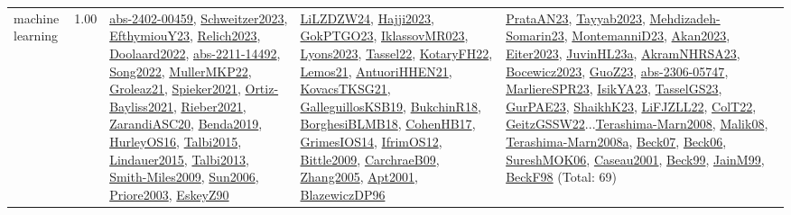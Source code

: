 {\begin{longtable}{p{3cm}r>{\raggedright\arraybackslash}p{6cm}>{\raggedright\arraybackslash}p{6cm}>{\raggedright\arraybackslash}p{8cm}}
\index{machine learning}\index{Algorithms!machine learning}machine learning &  1.00 & \hyperref[detail:abs-2402-00459]{abs-2402-00459}, \hyperref[detail:Schweitzer2023]{Schweitzer2023}, \hyperref[detail:EfthymiouY23]{EfthymiouY23}, \hyperref[detail:Relich2023]{Relich2023}, \hyperref[detail:Doolaard2022]{Doolaard2022}, \hyperref[detail:abs-2211-14492]{abs-2211-14492}, \hyperref[detail:Song2022]{Song2022}, \hyperref[detail:MullerMKP22]{MullerMKP22}, \hyperref[detail:Groleaz21]{Groleaz21}, \hyperref[detail:Spieker2021]{Spieker2021}, \hyperref[detail:Ortiz-Bayliss2021]{Ortiz-Bayliss2021}, \hyperref[detail:Rieber2021]{Rieber2021}, \hyperref[detail:ZarandiASC20]{ZarandiASC20}, \hyperref[detail:Benda2019]{Benda2019}, \hyperref[detail:HurleyOS16]{HurleyOS16}, \hyperref[detail:Talbi2015]{Talbi2015}, \hyperref[detail:Lindauer2015]{Lindauer2015}, \hyperref[detail:Talbi2013]{Talbi2013}, \hyperref[detail:Smith-Miles2009]{Smith-Miles2009}, \hyperref[detail:Sun2006]{Sun2006}, \hyperref[detail:Priore2003]{Priore2003}, \hyperref[detail:EskeyZ90]{EskeyZ90} & \hyperref[detail:LiLZDZW24]{LiLZDZW24}, \hyperref[detail:Hajji2023]{Hajji2023}, \hyperref[detail:GokPTGO23]{GokPTGO23}, \hyperref[detail:IklassovMR023]{IklassovMR023}, \hyperref[detail:Lyons2023]{Lyons2023}, \hyperref[detail:Tassel22]{Tassel22}, \hyperref[detail:KotaryFH22]{KotaryFH22}, \hyperref[detail:Lemos21]{Lemos21}, \hyperref[detail:AntuoriHHEN21]{AntuoriHHEN21}, \hyperref[detail:KovacsTKSG21]{KovacsTKSG21}, \hyperref[detail:GalleguillosKSB19]{GalleguillosKSB19}, \hyperref[detail:BukchinR18]{BukchinR18}, \hyperref[detail:BorghesiBLMB18]{BorghesiBLMB18}, \hyperref[detail:CohenHB17]{CohenHB17}, \hyperref[detail:GrimesIOS14]{GrimesIOS14}, \hyperref[detail:IfrimOS12]{IfrimOS12}, \hyperref[detail:Bittle2009]{Bittle2009}, \hyperref[detail:CarchraeB09]{CarchraeB09}, \hyperref[detail:Zhang2005]{Zhang2005}, \hyperref[detail:Apt2001]{Apt2001}, \hyperref[detail:BlazewiczDP96]{BlazewiczDP96} & \hyperref[detail:PrataAN23]{PrataAN23}, \hyperref[detail:Tayyab2023]{Tayyab2023}, \hyperref[detail:Mehdizadeh-Somarin23]{Mehdizadeh-Somarin23}, \hyperref[detail:MontemanniD23]{MontemanniD23}, \hyperref[detail:Akan2023]{Akan2023}, \hyperref[detail:Eiter2023]{Eiter2023}, \hyperref[detail:JuvinHL23a]{JuvinHL23a}, \hyperref[detail:AkramNHRSA23]{AkramNHRSA23}, \hyperref[detail:Bocewicz2023]{Bocewicz2023}, \hyperref[detail:GuoZ23]{GuoZ23}, \hyperref[detail:abs-2306-05747]{abs-2306-05747}, \hyperref[detail:MarliereSPR23]{MarliereSPR23}, \hyperref[detail:IsikYA23]{IsikYA23}, \hyperref[detail:TasselGS23]{TasselGS23}, \hyperref[detail:GurPAE23]{GurPAE23}, \hyperref[detail:ShaikhK23]{ShaikhK23}, \hyperref[detail:LiFJZLL22]{LiFJZLL22}, \hyperref[detail:ColT22]{ColT22}, \hyperref[detail:GeitzGSSW22]{GeitzGSSW22}...\hyperref[detail:Terashima-Marn2008]{Terashima-Marn2008}, \hyperref[detail:Malik08]{Malik08}, \hyperref[detail:Terashima-Marn2008a]{Terashima-Marn2008a}, \hyperref[detail:Beck07]{Beck07}, \hyperref[detail:Beck06]{Beck06}, \hyperref[detail:SureshMOK06]{SureshMOK06}, \hyperref[detail:Caseau2001]{Caseau2001}, \hyperref[detail:Beck99]{Beck99}, \hyperref[detail:JainM99]{JainM99}, \hyperref[detail:BeckF98]{BeckF98} (Total: 69)\\

\end{longtable}}
